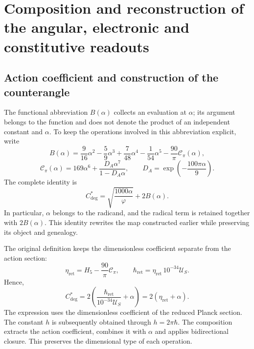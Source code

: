 \section{Composition and reconstruction of the angular, electronic and constitutive readouts}
\label{md:compos:seccion}

\subsection{Action coefficient and construction of the counterangle}
\label{md:compos:contraangulo}

The functional abbreviation $B(\alpha)$ collects an evaluation at $\alpha$;
its argument belongs to the function and does not denote the product of an
independent constant and $\alpha$. To keep the operations involved in this
abbreviation explicit, write
\begin{equation}
 B(\alpha)=\frac{9}{16}\alpha^2-\frac{5}{9}\alpha^3
 +\frac{7}{48}\alpha^4-\frac{1}{54}\alpha^5
 -\frac{90}{\pi}\mathcal C_\pi(\alpha),
 \label{md:compos:b-alpha}
\end{equation}
\begin{equation}
 \mathcal C_\pi(\alpha)=169\alpha^6+
 \frac{D_A\alpha^7}{1-D_A\alpha},
 \qquad D_A=\exp\!\left(-\frac{100\pi\alpha}{9}\right).
 \label{md:compos:correccion-regional}
\end{equation}
The complete identity is
\begin{equation}
 C^*_{\deg}=\sqrt{\frac{1000\alpha}{\varphi}}+2B(\alpha).
 \label{md:compos:contraangulo-abreviado}
\end{equation}
In particular, $\alpha$ belongs to the radicand, and the radical term is
retained together with $2B(\alpha)$. This identity rewrites the map
constructed earlier while preserving its object and genealogy.

The original definition keeps the dimensionless coefficient separate from
the action section:
\begin{equation}
 \eta_{\mathrm{ret}}=H_5-\frac{90}{\pi}\mathcal C_\pi,
 \qquad
 \hbar_{\mathrm{ret}}=\eta_{\mathrm{ret}}\,10^{-34}\mathcal U_S.
 \label{md:compos:seccion-accion}
\end{equation}
Hence,
\begin{equation}
 \boxed{C^*_{\deg}=2\left(
 \frac{\hbar_{\mathrm{ret}}}{10^{-34}\mathcal U_S}+\alpha\right)
 =2(\eta_{\mathrm{ret}}+\alpha).}
 \label{md:compos:contraangulo-accion}
\end{equation}
The expression uses the dimensionless coefficient of the reduced Planck
section. The constant $h$ is subsequently obtained through $h=2\pi\hbar$.
The composition extracts the action coefficient, combines it with $\alpha$
and applies bidirectional closure. This preserves the dimensional type of
each operation.

